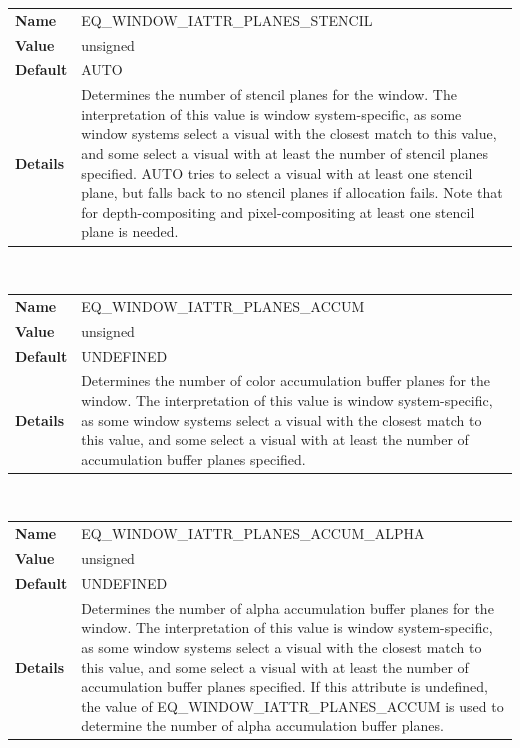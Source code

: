 \documentclass[10pt,a4]{scrartcl}
\begin{document}
\begin{center}
\begin{tabularx}{\textwidth}{|l|X|}
  \hline
  \textbf{Name} & EQ\_WINDOW\_IATTR\_PLANES\_STENCIL\\
  \textbf{Value} & unsigned\\
  \textbf{Default} & AUTO\\
  \textbf{Details} & Determines the number of stencil planes for the
  window. The interpretation of this value is window system-specific, as
  some window systems select a visual with the closest match to this
  value, and some select a visual with at least the number of stencil
  planes specified. AUTO tries to select a visual with at least one
  stencil plane, but falls back to no stencil planes if allocation
  fails. Note that for depth-compositing and pixel-compositing at least
  one stencil plane is needed.\\
  \hline
\end{tabularx}\\\vfill

\begin{tabularx}{\textwidth}{|l|X|}
  \hline
  \textbf{Name} & EQ\_WINDOW\_IATTR\_PLANES\_ACCUM\\
  \textbf{Value} & unsigned\\
  \textbf{Default} & UNDEFINED\\
  \textbf{Details} & Determines the number of color accumulation buffer
  planes for the window. The interpretation of this value is window
  system-specific, as some window systems select a visual with the
  closest match to this value, and some select a visual with at least
  the number of accumulation buffer planes specified.\\
  \hline
\end{tabularx}\\\vfill

\begin{tabularx}{\textwidth}{|l|X|}
  \hline
  \textbf{Name} & EQ\_WINDOW\_IATTR\_PLANES\_ACCUM\_ALPHA\\
  \textbf{Value} & unsigned\\
  \textbf{Default} & UNDEFINED\\
  \textbf{Details} & Determines the number of alpha accumulation buffer
  planes for the window. The interpretation of this value is window
  system-specific, as some window systems select a visual with the
  closest match to this value, and some select a visual with at least
  the number of accumulation buffer planes specified. If this attribute
  is undefined, the value of EQ\_WINDOW\_IATTR\_PLANES\_ACCUM is used to
  determine the number of alpha accumulation buffer planes.\\
  \hline
\end{tabularx}\\\vfill


\end{center}
\end{document}
